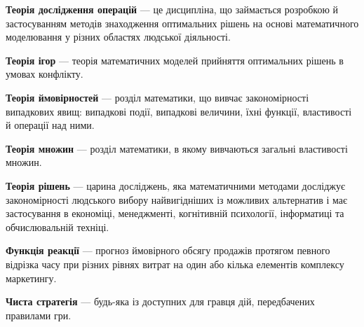 \documentclass[a4paper]{article}
\begin{document}
\textbf{Теорія дослідження операцій} — це дисципліна, що займається розробкою й застосуванням методів знаходження оптимальних рішень на основі математичного моделювання у різних областях людської діяльності.

\textbf{Теорія ігор} — теорія математичних моделей прийняття оптимальних рішень в умовах конфлікту.

\textbf{Теорія ймовірностей} — розділ математики, що вивчає закономірності випадкових явищ: випадкові події, випадкові величини, їхні функції, властивості й операції над ними.

\textbf{Теорія множин} — розділ математики, в якому вивчаються загальні властивості множин.

\textbf{Теорія рішень} — царина досліджень, яка математичними методами досліджує закономірності людського вибору найвигідніших із можливих альтернатив і має застосування в економіці, менеджменті, когнітивній психології, інформатиці та обчислювальній техніці.

\textbf{Функція реакції} — прогноз ймовірного обсягу продажів протягом певного відрізка часу при різних рівнях витрат на один або кілька елементів комплексу маркетингу.

\textbf{Чиста стратегія} — будь-яка із доступних для гравця дій, передбачених правилами гри.
\end{document}
